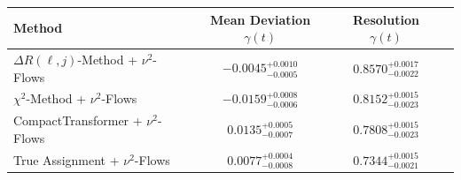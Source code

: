     \begin{tabular}{lccc}
        \toprule
        Method & Mean Deviation $\gamma(t)$ & Resolution $\gamma(t)$ \\
        \midrule
        $\Delta R(\ell,j)$-Method + $\nu^2$-Flows & $-0.0045^{+0.0010}_{-0.0005}$ & $0.8570^{+0.0017}_{-0.0022}$ \\
        $\chi^2$-Method + $\nu^2$-Flows & $-0.0159^{+0.0008}_{-0.0006}$ & $0.8152^{+0.0015}_{-0.0023}$ \\
        CompactTransformer + $\nu^2$-Flows & $0.0135^{+0.0005}_{-0.0007}$ & $0.7808^{+0.0015}_{-0.0023}$ \\
        True Assignment + $\nu^2$-Flows & $0.0077^{+0.0004}_{-0.0008}$ & $0.7344^{+0.0015}_{-0.0021}$ \\
        \bottomrule
    \end{tabular}